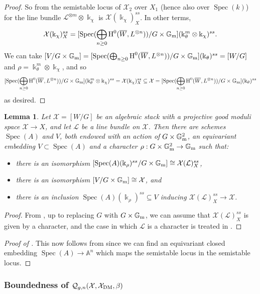 \documentclass{amsart}
\newcommand{\bA}{\mathbb{A}}
\newcommand{\bG}{\mathbb{G}}
\newcommand{\oH}{\operatorname{H}}
\newcommand{\cL}{\mathcal{L}}
\newcommand{\cQ}{\mathcal{Q}}
\newcommand{\cX}{\mathcal{X}}
\newcommand{\spec}{\operatorname{Spec}}
\newcommand{\Gm}{\bG_{{\rm m}}}
\newcommand{\dm}{{\rm DM}}
\newtheorem{Lemma}[theorem]{Lemma}
\theoremstyle{definition}
\theoremstyle{definition}
\begin{document}
{\begin{proof}
    So from  the semistable locus of $\cX_2$ over $X_1$ (hence also over $\spec(k)$) for the line bundle $\cL^{\otimes m}\otimes\Bbbk_\chi$ is $\cX(\Bbbk_\chi)^{ss}_X$. In other terms,
    \[
    \cX(\Bbbk_\chi)^{ss}_X = [\spec(\bigoplus_{n\ge 0}\oH^0(\overline{W}, L^{\otimes n}))/G\times \Gm](\Bbbk_{\theta}^m\otimes \Bbbk_\chi)^{ss}.
    \]
We can take $[V/G\times \Gm]=[\spec(\bigoplus_{n\ge 0}\oH^0(\overline{W}, L^{\otimes n}))/G\times \Gm](\Bbbk_{\theta})^{ss}=[W/G]$ and $\rho=\Bbbk_{\theta}^m\otimes \Bbbk_\chi$, and so \[[\spec(\bigoplus_{n\ge 0}\oH^0(\overline{W}, L^{\otimes n}))/G\times \Gm](\Bbbk_{\theta}^m\otimes \Bbbk_\chi)^{ss} = \cX(\Bbbk_\chi)^{ss}_X\subseteq \cX =[\spec(\bigoplus_{n\ge 0}\oH^0(\overline{W}, L^{\otimes n}))/G\times \Gm](\Bbbk_{\theta})^{ss}\] as desired.
\end{proof}
\begin{Lemma}\label{cor_embed_into_spec(A)/G}
    Let $\cX=[W/G]$ be an algebraic stack with a projective good moduli space $\cX\to X$, and let $\cL$ be a line bundle on $\cX$. Then there are schemes $\spec(A)$ and $V$, both endowed with an action of $G\times \Gm^2$, an equivariant embedding $V\subset\spec(A)$ and a character $\rho:G\times \Gm^2\to \Gm$ such that:
    \begin{itemize}
    \item there is an isomorphism $[\spec(A)(\Bbbk_\rho)^{ss}/G\times \Gm]\cong \cX(\cL)^{ss}_X$, 
    \item  there is an isomorphism $[V/G\times \Gm]\cong \cX$, and 
    \item there is an inclusion $\spec(A)(\Bbbk_\rho)^{ss}\subseteq V$ inducing $\cX(\cL)^{ss}_X\to \cX$.
\end{itemize}
\end{Lemma}
\begin{proof}
From , up to replacing $G$ with $G\times \Gm$, we can assume that $\cX(\cL)^{ss}_X$ is given by a character, and the case in which $\cL$ is a character is treated in .
\end{proof}
\begin{proof}[Proof of ] This now follows from  since we can find an equivariant closed embedding $\spec(A)\to \bA^n$ which maps the semistable locus in the semistable locus.
\end{proof}


    \subsubsection{Boundedness of $\cQ_{g,n}(\cX,\cX_\dm,\beta)$}
    
}
\end{document}
